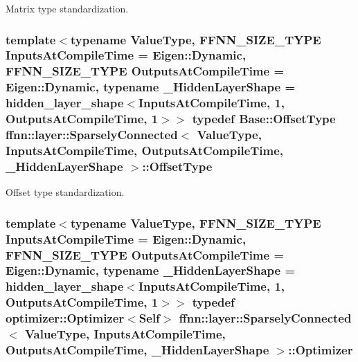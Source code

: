 Matrix type standardization. 

\hypertarget{classffnn_1_1layer_1_1_sparsely_connected_a0ca13855542b847611e9734e3d6a9f18}{
\subsubsection[{Offset\-Type}]{\setlength{\rightskip}{0pt plus 5cm}template$<$typename Value\-Type, F\-F\-N\-N\-\_\-\-S\-I\-Z\-E\-\_\-\-T\-Y\-P\-E Inputs\-At\-Compile\-Time = Eigen\-::\-Dynamic, F\-F\-N\-N\-\_\-\-S\-I\-Z\-E\-\_\-\-T\-Y\-P\-E Outputs\-At\-Compile\-Time = Eigen\-::\-Dynamic, typename \-\_\-\-Hidden\-Layer\-Shape = hidden\-\_\-layer\-\_\-shape$<$\-Inputs\-At\-Compile\-Time, 1, Outputs\-At\-Compile\-Time, 1$>$$>$ typedef {\bf Base\-::\-Offset\-Type} {\bf ffnn\-::layer\-::\-Sparsely\-Connected}$<$ Value\-Type, Inputs\-At\-Compile\-Time, Outputs\-At\-Compile\-Time, \-\_\-\-Hidden\-Layer\-Shape $>$\-::{\bf Offset\-Type}}}\label{classffnn_1_1layer_1_1_sparsely_connected_a0ca13855542b847611e9734e3d6a9f18}


Offset type standardization. 

\hypertarget{classffnn_1_1layer_1_1_sparsely_connected_a6371c852114c9312096816ee73d92175}{
\subsubsection[{Optimizer}]{\setlength{\rightskip}{0pt plus 5cm}template$<$typename Value\-Type, F\-F\-N\-N\-\_\-\-S\-I\-Z\-E\-\_\-\-T\-Y\-P\-E Inputs\-At\-Compile\-Time = Eigen\-::\-Dynamic, F\-F\-N\-N\-\_\-\-S\-I\-Z\-E\-\_\-\-T\-Y\-P\-E Outputs\-At\-Compile\-Time = Eigen\-::\-Dynamic, typename \-\_\-\-Hidden\-Layer\-Shape = hidden\-\_\-layer\-\_\-shape$<$\-Inputs\-At\-Compile\-Time, 1, Outputs\-At\-Compile\-Time, 1$>$$>$ typedef {\bf optimizer\-::\-Optimizer}$<${\bf Self}$>$ {\bf ffnn\-::layer\-::\-Sparsely\-Connected}$<$ Value\-Type, Inputs\-At\-Compile\-Time, Outputs\-At\-Compile\-Time, \-\_\-\-Hidden\-Layer\-Shape $>$\-::{\bf Optimizer}}}\label{classffnn_1_1layer_1_1_sparsely_connected_a6371c852114c9312096816ee73d92175}


